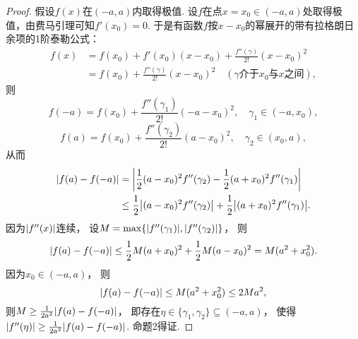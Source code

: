 \begin{example}
\begin{proof}
假设\(f(x)\)在\((-a,a)\)内取得极值.
设\(f\)在点\(x=x_0\in(-a,a)\)处取得极值，由费马引理可知\(f'(x_0)=0\).
于是有函数\(f\)按\(x-x_0\)的幂展开的带有拉格朗日余项的1阶泰勒公式：
\begin{align*}
	f(x) &= f(x_0) + f'(x_0) (x-x_0) + \frac{f''(\gamma)}{2!} (x-x_0)^2 \\
	&= f(x_0) + \frac{f''(\gamma)}{2!} (x-x_0)^2
	\quad(\text{\(\gamma\)介于\(x_0\)与\(x\)之间}),
\end{align*}
则\begin{equation*}
	f(-a) = f(x_0) + \frac{f''(\gamma_1)}{2!}(-a-x_0)^2,
	\quad\gamma_1\in(-a,x_0),
\end{equation*}\begin{equation*}
	f(a) = f(x_0) + \frac{f''(\gamma_2)}{2!} (a-x_0)^2,
	\quad\gamma_2\in(x_0,a),
\end{equation*}
从而
\begin{align*}
	\abs{f(a)-f(-a)}
	&= \abs{\frac{1}{2} (a-x_0)^2 f''(\gamma_2) - \frac{1}{2} (a+x_0)^2 f''(\gamma_1)} \\
	&\leq \frac{1}{2} \abs{(a-x_0)^2 f''(\gamma_2)} + \frac{1}{2} \abs{(a+x_0)^2 f''(\gamma_1)}.
\end{align*}
因为\(\abs{f''(x)}\)连续，
设\(M = \max\{ \abs{f''(\gamma_1)}, \abs{f''(\gamma_2)} \}\)，
则\begin{equation*}
	\abs{f(a) - f(-a)}
	\leq \frac{1}{2} M(a+x_0)^2 + \frac{1}{2} M(a-x_0)^2
	= M(a^2 + x_0^2).
\end{equation*}
因为\(x_0\in(-a,a)\)，
则\begin{equation*}
	\abs{f(a) - f(-a)} \leq M(a^2+x_0^2) \leq 2 M a^2,
\end{equation*}
则\(M \geq \frac{1}{2 a^2} \abs{f(a) - f(-a)}\)，
即存在\(\eta\in\{\gamma_1,\gamma_2\}\subseteq(-a,a)\)，
使得\(\abs{f''(\eta)} \geq \frac{1}{2 a^2} \abs{f(a) - f(-a)}\).
命题2得证.
\end{proof}
\end{example}


